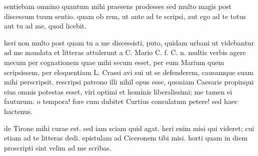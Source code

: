 


 sentiebam omnino quantum mihi praesens prodesses sed multo magis post discessum tuum sentio. quam ob rem, ut ante ad te scripsi, aut ego ad te totus aut tu ad me, quod licebit.

 heri non multo post quam tu a me discessisti, puto, quidam urbani ut videbantur ad me mandata et litteras attulerunt a C. Mario C. f. C. n. multis verbis agere mecum per cognationem quae mihi secum esset, per eum Marium quem scripsissem, per eloquentiam L. Crassi avi sui ut se defenderem, causamque suam mihi perscripsit. rescripsi patrono illi nihil opus esse, quoniam Caesaris propinqui eius omnis potestas esset, viri optimi et hominis liberalissimi; me tamen ei fauturum. o tempora! fore cum dubitet Curtius consulatum petere! sed haec hactenus.

 de Tirone mihi curae est. sed iam sciam quid agat. heri enim misi qui videret; cui etiam ad te litteras dedi. epistulam ad Ciceronem tibi misi. horti quam in diem proscripti sint velim ad me scribas.
